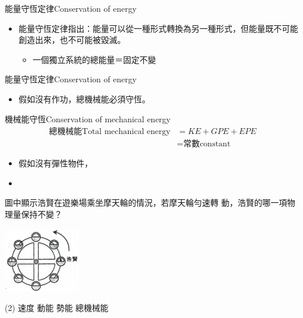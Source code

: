\documentclass[beamer=true]{standalone}
\begin{document}
\begin{frame}{能量守恆定律Conservation of energy}
    \begin{itemize}
        \item 能量守恆定律指出：能量可以從一種形式轉換為另一種形式，但能量既不可能創造出來，也不可能被毀滅。
              \begin{itemize}
                  \item 一個獨立系統的總能量＝固定不變
              \end{itemize}
    \end{itemize}
\end{frame}

\begin{frame}{能量守恆定律Conservation of energy}
    \begin{itemize}
        \item 假如沒有作功，總機械能必須守恆。
    \end{itemize}
    \begin{exampleblock}
        {機械能守恆Conservation of mechanical energy}
        \begin{align*}
            \textrm{總機械能Total mechanical energy} & =KE+GPE+EPE          \\
                                                 & =\textrm{常數constant}
        \end{align*}
    \end{exampleblock}
    \begin{itemize}
        \item 假如沒有彈性物件，
        \item[] 
    \end{itemize}
\end{frame}

\begin{eg}
    圖中顯示浩賢在遊樂場乘坐摩天輪的情況，若摩天輪勻速轉 動，浩賢的哪一項物理量保持不變？
    {\par\centering
    \includegraphics[width=0.25\textwidth]{assets/54a93bf1.png}
    \par}
    \begin{tasks}(2)
        \task 速度
        \task 動能
        \task 勢能
        \task 總機械能
    \end{tasks}
\end{eg}
\end{document}
